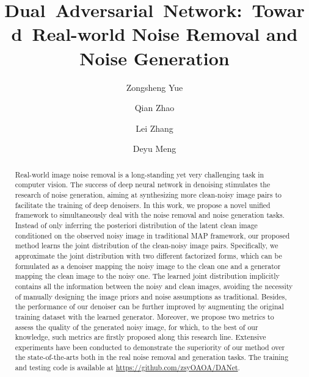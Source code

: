 \documentclass[runningheads]{llncs}
\begin{document}
\pagestyle{headings}
\mainmatter
\def\ECCVSubNumber{984}  

\title{\mbox{Dual Adversarial Network: Toward Real-world} Noise Removal and Noise Generation} 



\author{Zongsheng Yue \and
Qian Zhao \and
Lei Zhang \and
Deyu Meng}
\maketitle

\begin{abstract}
Real-world image noise removal is a long-standing yet very challenging task in computer vision.
The success of deep neural network in denoising stimulates the research of
noise generation, aiming at synthesizing more clean-noisy image pairs to facilitate the training of deep denoisers.
In this work, we propose a novel unified framework to simultaneously deal with the noise removal and
noise generation tasks. Instead of only inferring the posteriori distribution of the latent clean image conditioned on
the observed noisy image in traditional MAP framework, our proposed method learns the joint distribution of
the clean-noisy image pairs.
Specifically, we approximate the joint distribution with two different factorized forms, 
which can be formulated as a denoiser mapping the noisy image to the clean one and a generator mapping
the clean image to the noisy one.
The learned joint distribution implicitly contains all the information between
the noisy and clean images, avoiding the necessity of manually designing the image priors and noise assumptions
as traditional.
Besides, the performance of our denoiser can be further improved by augmenting the original training
dataset with the learned generator.
Moreover, we propose two metrics to assess the quality of the generated noisy image, for which, to the best of
our knowledge, such metrics are firstly proposed along this research line.
Extensive experiments have been conducted to demonstrate the superiority
of our method over the state-of-the-arts both in the real noise removal and generation tasks.
The training and testing code is available at \url{https://github.com/zsyOAOA/DANet}.
\end{abstract}
\end{document}
